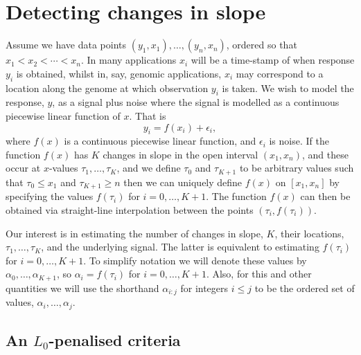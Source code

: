 \documentclass[article]{jss}
\begin{document}
%
%



\section[Background]{Detecting changes in slope} \label{sec:background}

Assume we have data points $(y_1,x_1),\ldots,(y_n,x_n)$, ordered so that $x_1<x_2<\cdots<x_n$. In many applications $x_i$ will be a time-stamp of when response $y_i$ is obtained, whilst in, say, genomic applications, $x_i$ may correspond to a location along the genome at which observation $y_i$ is taken. We wish to model the response, $y$, as a signal plus noise where the signal is modelled as a continuous piecewise linear function of $x$. That is
\begin{equation} \label{eq:cinslope}
y_i=f(x_i)+\epsilon_i,
\end{equation}
where $f(x)$ is a continuous piecewise linear function, and $\epsilon_i$ is noise. If the function $f(x)$ has $K$ changes in slope in the open interval $(x_1,x_n)$, and these occur at $x$-values $\tau_1,\ldots,\tau_K$, and we define $\tau_0$ and $\tau_{K+1}$ to be arbitrary values such that $\tau_0\leq x_1$ and $\tau_{K+1}\geq n$ then we can uniquely define $f(x)$ on $[x_1,x_n]$ by specifying the values $f(\tau_i)$ for $i=0,\ldots,K+1$. The function $f(x)$ can then be obtained via straight-line interpolation between the points $(\tau_i,f(\tau_i))$.

Our interest is in estimating the number of changes in slope, $K$, their locations, $\tau_1,\ldots,\tau_K$, and the underlying signal. The latter is equivalent to estimating $f(\tau_i)$ for $i=0,\ldots,K+1$. To simplify notation we will denote these values by $\alpha_0,\ldots,\alpha_{K+1}$, so $\alpha_i=f(\tau_i)$ for $i=0,\ldots,K+1$. Also, for this and other quantities we will use the shorthand $\alpha_{i:j}$ for integers $i\leq j$ to be the ordered set of values, $\alpha_i,\ldots,\alpha_j$.

\subsection{An $L_0$-penalised criteria}
\end{document}
